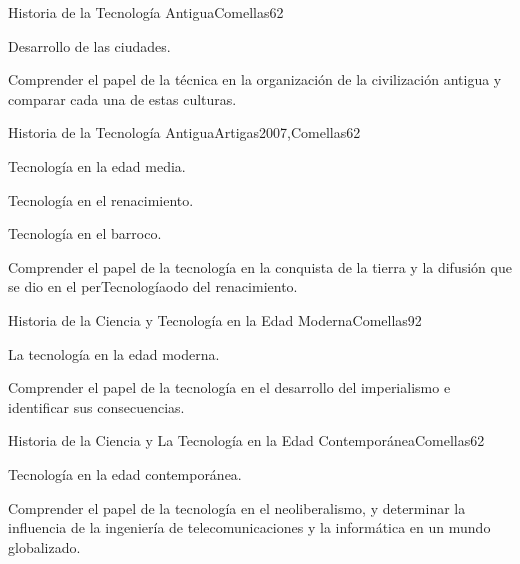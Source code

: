 \begin{syllabus}
\begin{unit}{Historia de la Tecnología Antigua}{Comellas}{6}{2}
\begin{topics}
    \item Desarrollo de las ciudades.
\end{topics}
\begin{learningoutcomes}
    \item Comprender el papel de la técnica en la organización de la civilización antigua y comparar cada una de estas culturas.
\end{learningoutcomes}
\end{unit}

\begin{unit}{Historia de la Tecnología Antigua}{Artigas2007,Comellas}{6}{2}
\begin{topics}
    \item Tecnología en la edad media.
    \item Tecnología en el renacimiento.
    \item Tecnología en el barroco.
\end{topics}
\begin{learningoutcomes}
    \item Comprender el  papel de la tecnología en la conquista de la tierra y la difusión que se dio en el perTecnologíaodo del renacimiento.
\end{learningoutcomes}

\end{unit}

\begin{unit}{Historia de la Ciencia y Tecnología en la Edad Moderna}{Comellas}{9}{2}
\begin{topics}
      \item {La tecnología en la edad moderna.}
\end{topics}
\begin{learningoutcomes}
	\item Comprender el  papel de la tecnología en el desarrollo del imperialismo e identificar sus consecuencias.
\end{learningoutcomes}
\end{unit}

\begin{unit}{Historia de la Ciencia y La Tecnología en la Edad Contemporánea}{Comellas}{6}{2}
\begin{topics}
      \item {Tecnología en la edad contemporánea.}
\end{topics}
\begin{learningoutcomes}
	\item Comprender el  papel de la tecnología en el neoliberalismo, y determinar la influencia de la ingeniería de telecomunicaciones y la informática en un mundo globalizado.
\end{learningoutcomes}
\end{unit}


\end{syllabus}
